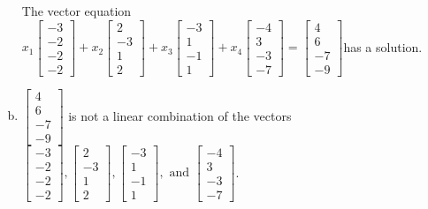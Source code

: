 \begin{exerciseAnswer}
\begin{enumerate}[(a)]
\begin{center}
\begin{minipage}{0.8\textwidth}
 The vector equation \( x_{1} \left[\begin{array}{c}
-3 \\
-2 \\
-2 \\
-2
\end{array}\right] + x_{2} \left[\begin{array}{c}
2 \\
-3 \\
1 \\
2
\end{array}\right] + x_{3} \left[\begin{array}{c}
-3 \\
1 \\
-1 \\
1
\end{array}\right] + x_{4} \left[\begin{array}{c}
-4 \\
3 \\
-3 \\
-7
\end{array}\right] = \left[\begin{array}{c}
4 \\
6 \\
-7 \\
-9
\end{array}\right] \)has a solution.
\end{minipage}\end{center}
    
\item 

\( \left[\begin{array}{c}
4 \\
6 \\
-7 \\
-9
\end{array}\right] \) is not a linear combination of the vectors \( \left[\begin{array}{c}
-3 \\
-2 \\
-2 \\
-2
\end{array}\right] , \left[\begin{array}{c}
2 \\
-3 \\
1 \\
2
\end{array}\right] , \left[\begin{array}{c}
-3 \\
1 \\
-1 \\
1
\end{array}\right] , \text{ and } \left[\begin{array}{c}
-4 \\
3 \\
-3 \\
-7
\end{array}\right] \). 


\end{enumerate}
    
\end{exerciseAnswer}
    
